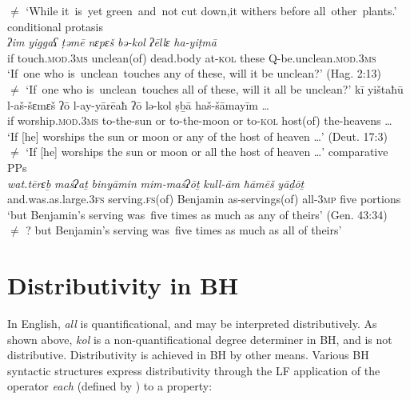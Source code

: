 \documentclass[output=paper]{langsci/langscibook}
\begin{document}
        ${\neq}$  `While it~is~yet green~and~not cut down,it withers before all~other~plants.'
\ex %
    conditional protasis\label{ex:doron:43}\\
    \ea
    \gll \textit{ʔim}    \textit{yiggaʕ}                 \textit{ṭəmē}             \textit{nɛpɛš}          \textit{bə-kol}   \textit{ʔēllɛ}  \textit{ha-yiṭmā}\\
         if       touch.\textsc{mod.3ms}   unclean(of)  dead.body  at-\textsc{kol} these  Q-be.unclean\textsc{.mod.3ms}   \\
    \glt `If~one who is~unclean~touches any of these, will it be unclean?' (Hag. 2:13)\\
        ${\neq}$   `If~one who is~unclean~touches all of these, will it all be unclean?'
    \ex
    \gll kī yištaħū l-aš{}-šɛmɛš  ʔō  l-ay-yārēaħ  ʔō   lə-kol   ṣḇā         haš{}-šāmayīm  …\\
         if  worship.\textsc{mod.3ms}  to-the-sun  or  to-the-moon  or  to-\textsc{kol} host(of) the-heavens  … \\
    \glt `If [he] worships the sun or moon or any of the host of heaven …' (Deut. 17:3)\\
        ${\neq}$   `If [he] worships the sun or moon or all the host of heaven …'
    \z
\ex%
comparative PPs\label{ex:doron:44}\\
\gll  \textit{wat.tērɛḇ}                     \textit{ma}\textit{ś}\textit{ʔaṯ}           \textit{binyāmin}   \textit{mim-ma}\textit{ś}\textit{ʔōṯ}      \textit{kull-ām} \textit{ħāmēš} \textit{yāḏōṯ}\\
and.was.as.large.3\textsc{fs}  serving.\textsc{fs}(of) Benjamin  as-servings(of) all-\textsc{3mp}  five     portions\\
\glt `but Benjamin’s serving was~five times as much as any of theirs' (Gen. 43:34)\\
    ${\neq}$ ? but Benjamin’s serving was~five times as much as all of theirs'
\z\pagebreak

\section{Distributivity in BH}\label{sec:doron:4}%

In English, \textit{all} is quantificational, and may be interpreted distributively.  \linebreak As shown above, \textit{kol} is a non-quantificational degree determiner in BH, and is not distributive. Distributivity is achieved in BH by other means. Various BH syntactic structures express distributivity through the LF application of the operator \textit{each} (defined by \citealt{Link1987}) to a property:
\end{document}
